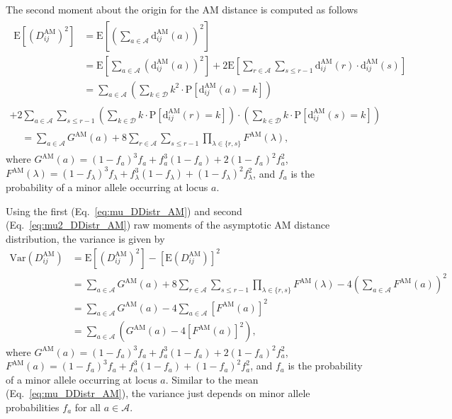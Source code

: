 \documentclass[aoas]{imsart}
\begin{document}
The second moment about the origin for the AM distance is computed as follows
%
\begin{equation}\label{eq:mu2_DDistr_AM}
\begin{split}
\begin{aligned}
\text{E}\left[\left(D^\text{AM}_{ij}\right)^2\right] &= \text{E}\left[\left(\sum_{a \in \mathcal{A}} \text{d}^\text{AM}_{ij}(a)\right)^2\right] \\
&= \text{E}\left[\sum_{a \in \mathcal{A}} \left(\text{d}^\text{AM}_{ij}(a)\right)^2\right] + 2 \text{E}\left[\sum_{r \in \mathcal{A}} \sum_{s \leq r - 1} \text{d}^\text{AM}_{ij}(r) \cdot \text{d}^\text{AM}_{ij}(s)\right] \\
&= \sum_{a \in \mathcal{A}} \left(\sum_{k \in \mathcal{D}} k^2 \cdot \text{P}\left[\text{d}^\text{AM}_{ij}(a) = k\right]\right)
\end{aligned}\\
+ 2\sum_{a \in \mathcal{A}} \sum_{s \leq r - 1} \left(\sum_{k \in \mathcal{D}} k \cdot \text{P}\left[\text{d}^\text{AM}_{ij}(r) = k\right]\right) \cdot \left(\sum_{k \in \mathcal{D}} k \cdot \text{P}\left[\text{d}^\text{AM}_{ij}(s) = k\right]\right) \\
\begin{aligned}
&= \sum_{a \in \mathcal{A}} G^\text{AM}(a) + 8 \sum_{r \in \mathcal{A}} \sum_{s \leq r - 1} \prod_{\lambda \in \{r,s\}} F^\text{AM}(\lambda),
\end{aligned}
\end{split}
\end{equation}
%
where $G^\text{AM}(a) = (1 - f_a)^3 f_a + f^3_a (1 - f_a) + 2 (1 - f_a)^2 f^2_a$, $F^\text{AM}(\lambda) = (1 - f_\lambda)^3 f_\lambda + f^3_\lambda (1 - f_\lambda) + (1 - f_\lambda)^2 f^2_\lambda$, and $f_a$ is the probability of a minor allele occurring at locus $a$.

Using the first (Eq.~\ref{eq:mu_DDistr_AM}) and second (Eq.~\ref{eq:mu2_DDistr_AM}) raw moments of the asymptotic AM distance distribution, the variance is given by
%
\begin{equation}\label{eq:var_DDistr_AM}
\begin{aligned}
\text{Var}\left(D^\text{AM}_{ij}\right) &= \text{E}\left[\left(D^\text{AM}_{ij}\right)^2\right] - \left[\text{E}\left(D^\text{AM}_{ij}\right)\right]^2 \\
&= \sum_{a \in \mathcal{A}} G^\text{AM}(a) + 8\sum_{r \in \mathcal{A}} \sum_{s \leq r - 1} \prod_{\lambda \in \{r,s\}} F^\text{AM}(\lambda) - 4\left(\sum_{a \in \mathcal{A}}F^\text{AM}(a)\right)^2 \\
&= \sum_{a \in \mathcal{A}} G^\text{AM}(a) - 4\sum_{a \in \mathcal{A}}\left[F^\text{AM}(a)\right]^2 \\
&= \sum_{a \in \mathcal{A}} \left(G^\text{AM}(a)- 4\left[F^\text{AM}(a)\right]^2\right),
\end{aligned}
\end{equation}
%
where $G^\text{AM}(a) = (1 - f_a)^3 f_a + f^3_a (1 - f_a) + 2 (1 - f_a)^2 f^2_a$, $F^\text{AM}(a) = (1 - f_a)^3 f_a + f^3_a (1 - f_a) + (1 - f_a)^2 f^2_a$, and $f_a$ is the probability of a minor allele occurring at locus $a$. Similar to the mean (Eq.~\ref{eq:mu_DDistr_AM}), the variance just depends on minor allele probabilities $f_a$ for all $a \in \mathcal{A}$.
\end{document}
